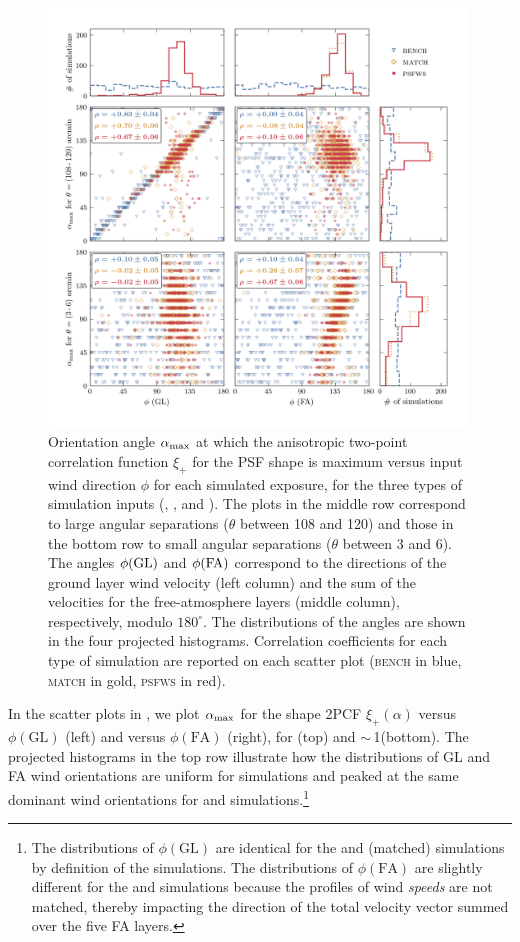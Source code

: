 \documentclass[twocolumn]{aastex631}
\begin{document}
\begin{figure}
\includegraphics[width=0.99\textwidth]{f7_alphamax_scatter.png}
    \caption{Orientation angle $\alpha_{\rm max}$ at which the anisotropic two-point correlation function $\xi_{+}$ for the PSF shape is maximum versus input wind direction $\phi$ for each simulated exposure, for the three types of simulation inputs (\bench, \match, and \psfwssims).
    The plots in the middle row correspond to large angular separations ($\theta$ between 108 and 120\amin) and those in the bottom row to small angular separations ($\theta$ between 3 and 6\amin).
    The angles $\phi({\rm GL})$ and $\phi({\rm FA})$ correspond to the directions of the ground layer wind velocity (left column) and the sum of the velocities for the free-atmosphere layers (middle column), respectively, modulo $180^\circ$. 
    The distributions of the angles are shown in the four projected histograms.
    Correlation coefficients for each type of simulation are reported on each scatter plot (\textsc{bench} in blue, \textsc{match} in gold, \textsc{psfws} in red).
    \label{fig:bigscatter}
    }
\end{figure}

In the scatter plots in , we plot $\alpha_{\rm max}$ for the shape 2PCF $\xi_+(\alpha)$ versus $\phi(\text{GL})$ (left) and versus $\phi(\text{FA})$ (right), for \largesep (top) and $\sim\,$1\amin (bottom).  
The projected histograms in the top row illustrate how the distributions of GL and FA wind orientations are uniform for \bench simulations and peaked at the same dominant wind orientations for \psfwssims and \match simulations.\footnote{The distributions of $\phi(\text{GL})$ are identical for the \psfwssims and \match (matched) simulations by definition of the \match simulations. The distributions of $\phi(\text{FA})$ are slightly different for the \psfwssims and \match simulations because the profiles of wind \textit{speeds} are not matched, thereby impacting the direction of the total velocity vector summed over the five FA layers.}  
\end{document}
